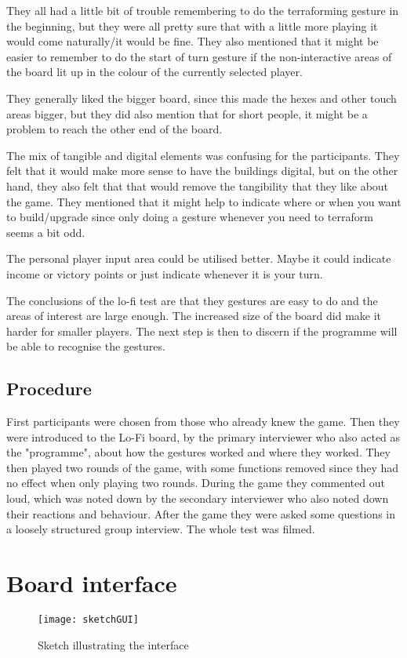 They all had a little bit of trouble remembering to do the terraforming gesture in the beginning, but they were all pretty sure that with a little more playing it would come naturally/it would be fine. They also mentioned that it might be easier to remember to do the start of turn gesture if the non-interactive areas of the board lit up in the colour of the currently selected player. 

They generally liked the bigger board, since this made the hexes and other touch areas bigger, but they did also mention that for short people, it might be a problem to reach the other end of the board. 

The mix of tangible and digital elements was confusing for the participants. They felt that it would make more sense to have the buildings digital, but on the other hand, they also felt that that would remove the tangibility that they like about the game. They mentioned that it might help to indicate where or when you want to build/upgrade since only doing a gesture whenever you need to terraform seems a bit odd. 

The personal player input area could be utilised better. Maybe it could indicate income or victory points or just indicate whenever it is your turn. 

The conclusions of the lo-fi test are that they gestures are easy to do and the areas of interest are large enough. The increased size of the board did make it harder for smaller players. The next step is then to discern if the programme will be able to recognise the gestures. 

\subsection{Procedure}
First participants were chosen from those who already knew the game.
Then they were introduced to the Lo-Fi board, by the primary interviewer who also acted as the "programme", about how the gestures worked and where they worked. They then played two rounds of the game, with some functions removed since they had no effect when only playing two rounds. During the game they commented out loud, which was noted down by the secondary interviewer who also noted down their reactions and behaviour. 
After the game they were asked some questions in a loosely structured group interview. 
The whole test was filmed.

\section{Board interface}
\begin{figure}
\centering
\texttt{[image: sketchGUI]}
\caption{Sketch illustrating the interface}
\end{figure}

